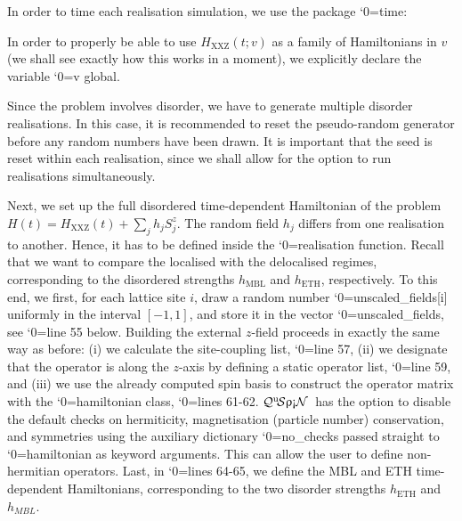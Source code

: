 \documentclass{SciPost}
\newcommand\0{\scalebox{-1}[1]{0}}
\let\svttfamily\ttfamily
\renewcommand\ttfamily{\svttfamily\catcode`0=\active }
\renewcommand\texttt{\bgroup\ttfamily\texttthelp}
\def\texttthelp#1{#1\egroup}
\newcommand{\qspin}{$\mathcal{Q}^{\mathrm{u}}\!\mathcal{S}\uprho\mathrm{\text{\textexclamdown}}\mathcal{N}$}
\begin{document}

%
In order to time each realisation simulation, we use the package \texttt{time}:

%
In order to properly be able to use $H_\mathrm{XXZ}(t;v)$ as a family of Hamiltonians in $v$ (we shall see exactly how this works in a moment), we explicitly declare the variable \texttt{v} global.  

%
Since the problem involves disorder, we have to generate multiple disorder realisations. In this case, it is recommended to reset the pseudo-random generator before any random numbers have been drawn. It is important that the seed is reset within each realisation, since we shall allow for the option to run realisations simultaneously.  

%
Next, we set up the full disordered time-dependent Hamiltonian of the problem $H(t) = H_\mathrm{XXZ}(t) + \sum_j h_jS^z_j$. The random field $h_j$ differs from one realisation to another. Hence, it has to be defined inside the \texttt{realisation} function. Recall that we want to compare the localised with the delocalised regimes, corresponding to the disordered strengths $h_\mathrm{MBL}$ and $h_\mathrm{ETH}$, respectively. To this end, we first, for each lattice site $i$, draw a random number \texttt{unscaled\_fields[i]} uniformly in the interval $[-1,1]$, and store it in the vector \texttt{unscaled\_fields}, see \texttt{line 55} below. Building the external $z$-field proceeds in exactly the same way as before: (i) we calculate the site-coupling list, \texttt{line 57}, (ii) we designate that the operator is along the $z$-axis by defining a static operator list, \texttt{line 59}, and (iii) we use the already computed spin basis to construct the operator matrix with the \texttt{hamiltonian} class, \texttt{lines 61-62}. \qspin\ has the option to disable the default checks on hermiticity, magnetisation (particle number) conservation, and symmetries using the auxiliary dictionary \texttt{no\_checks} passed straight to \texttt{hamiltonian} as keyword arguments. This can allow the user to define non-hermitian operators. Last, in \texttt{lines 64-65}, we define the MBL and ETH time-dependent Hamiltonians, corresponding to the two disorder strengths $h_\mathrm{ETH}$ and $h_{MBL}$.  

%
\end{document}
